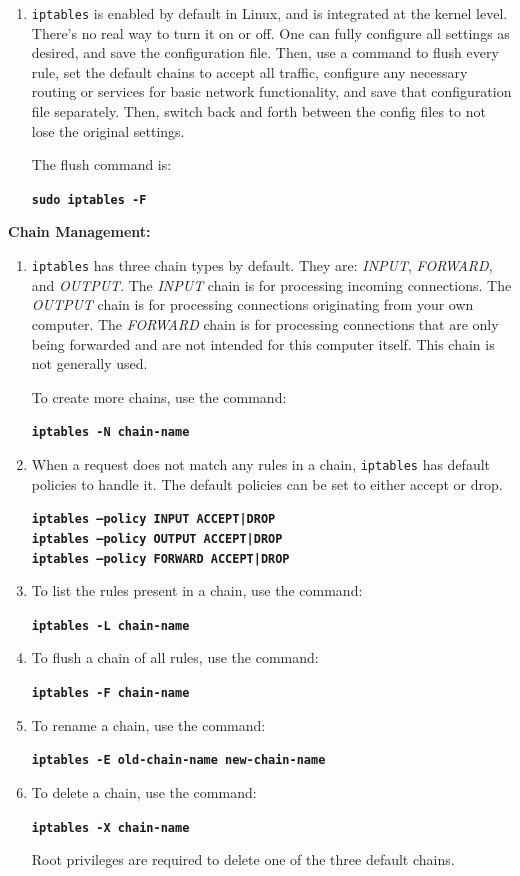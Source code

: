 \documentclass[12pt]{extarticle}
\begin{document}
\begin{enumerate}
\item \texttt{iptables} is enabled by default in Linux, and is integrated at the kernel level. There's no real way to turn it on or off. One can fully configure all settings as desired, and save the configuration file. Then, use a command to flush every rule, set the default chains to accept all traffic, configure any necessary routing or services for basic network functionality, and save that configuration file separately. Then, switch back and forth between the config files to not lose the original settings. 

The flush command is:

\texttt{\textbf{sudo iptables -F}}

\end{enumerate}


\item \textbf{Chain Management:}
\begin{enumerate}

\item \texttt{iptables} has three chain types by default. They are: \textit{INPUT}, \textit{FORWARD}, and \textit{OUTPUT}. The \textit{INPUT} chain is for processing incoming connections. The \textit{OUTPUT} chain is for processing connections originating from your own computer. The \textit{FORWARD} chain is for processing connections that are only being forwarded and are not intended for this computer itself. This chain is not generally used. 

To create more chains, use the command: 

\texttt{\textbf{iptables -N chain-name}}

\item When a request does not match any rules in a chain, \texttt{iptables} has default policies to handle it. The default policies can be set to either accept or drop.

\texttt{\textbf{iptables --policy INPUT ACCEPT|DROP}}\\
\texttt{\textbf{iptables --policy OUTPUT ACCEPT|DROP}}\\
\texttt{\textbf{iptables --policy FORWARD ACCEPT|DROP}}

\item To list the rules present in a chain, use the command: 

\texttt{\textbf{iptables -L chain-name}}

\item To flush a chain of all rules, use the command:

\texttt{\textbf{iptables -F chain-name}}

\item To rename a chain, use the command: 

\texttt{\textbf{iptables -E old-chain-name new-chain-name}}

\item To delete a chain, use the command:

\texttt{\textbf{iptables -X chain-name}}

Root privileges are required to delete one of the three default chains. 

\end{enumerate}
\end{document}
